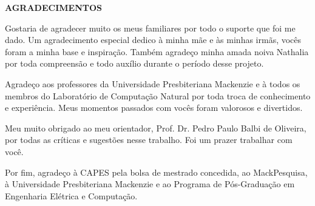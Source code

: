 \newpage
\pagestyle{empty}
\large
\textbf{AGRADECIMENTOS}

Gostaria de agradecer muito os meus familiares por todo o suporte que foi me dado. Um agradecimento especial dedico à minha mãe e às minhas irmãs, vocês foram a minha base e inspiração. Também agradeço minha amada noiva Nathalia por toda compreensão e todo auxílio durante o período desse projeto.

Agradeço aos professores da Universidade Presbiteriana Mackenzie e à todos os membros do Laboratório de Computação Natural por toda troca de conhecimento e experiência. Meus momentos passados com vocês foram valorosos e divertidos.

Meu muito obrigado ao meu orientador, Prof. Dr. Pedro Paulo Balbi de Oliveira, por todas as críticas e sugestões nesse trabalho. Foi um prazer trabalhar com você.

Por fim, agradeço à CAPES pela bolsa de mestrado concedida, ao MackPesquisa, à Universidade Presbiteriana Mackenzie e ao Programa de Pós-Graduação em Engenharia Elétrica e Computação.